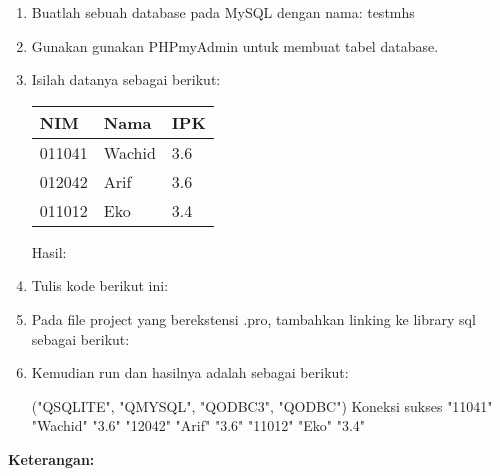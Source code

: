 \begin{enumerate}


\item
Buatlah sebuah database pada MySQL dengan nama: testmhs
\item
Gunakan gunakan PHPmyAdmin untuk membuat tabel database.


\item
Isilah datanya sebagai berikut:

\begin{longtable}[]{@{}lll@{}}
\toprule
NIM & Nama & IPK\tabularnewline
\midrule
\endhead
011041 & Wachid & 3.6\tabularnewline
012042 & Arif & 3.6\tabularnewline
011012 & Eko & 3.4\tabularnewline
\bottomrule
\end{longtable}

Hasil:


\item
Tulis kode berikut ini:




\item
Pada file project yang berekstensi .pro, tambahkan linking ke library
sql sebagai berikut:


\item
Kemudian run dan hasilnya adalah sebagai berikut:

\begin{lcverbatim}
("QSQLITE", "QMYSQL", "QODBC3", "QODBC")
Koneksi sukses
"11041"
"Wachid"
"3.6"
"12042"
"Arif"
"3.6"
"11012"
"Eko"
"3.4"
\end{lcverbatim}
\end{enumerate}

\textbf{Keterangan:}

